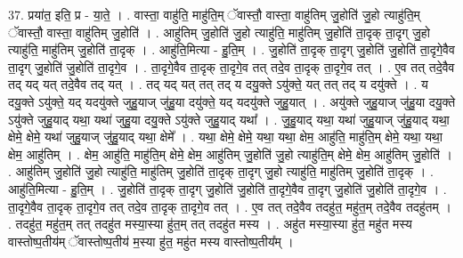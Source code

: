 \documentclass[17pt]{extarticle}
\begin{document}
37. प्रया॑त॒ इति॒ प्र - या॒ते॒ । . वास्ता॒ वाहु॑ति॒ माहु॑ति॒म् ॅवास्तौ॒ वास्ता॒ वाहु॑तिम् जु॒होति॑ जु॒हो त्याहु॑ति॒म् ॅवास्तौ॒ वास्ता॒ वाहु॑तिम् जु॒होति॑ । . आहु॑तिम् जु॒होति॑ जु॒हो त्याहु॑ति॒ माहु॑तिम् जु॒होति॑ ता॒दृक् ता॒दृग् जु॒हो त्याहु॑ति॒ माहु॑तिम् जु॒होति॑ ता॒दृक् । . आहु॑ति॒मित्या - हु॒ति॒म् । . जु॒होति॑ ता॒दृक् ता॒दृग् जु॒होति॑ जु॒होति॑ ता॒दृगे॒वैव ता॒दृग् जु॒होति॑ जु॒होति॑ ता॒दृगे॒व । . ता॒दृगे॒वैव ता॒दृक् ता॒दृगे॒व तत् तदे॒व ता॒दृक् ता॒दृगे॒व तत् । . ए॒व तत् तदे॒वैव तद् यद् यत् तदे॒वैव तद् यत् । . तद् यद् यत् तत् तद् य दयु॒क्ते ऽयु॑क्ते॒ यत् तत् तद् य दयु॑क्ते । . य दयु॒क्ते ऽयु॑क्ते॒ यद् यदयु॑क्ते जुहु॒याज् जु॑हु॒या दयु॑क्ते॒ यद् यदयु॑क्ते जुहु॒यात् । . अयु॑क्ते जुहु॒याज् जु॑हु॒या दयु॒क्ते ऽयु॑क्ते जुहु॒याद् यथा॒ यथा॑ जुहु॒या दयु॒क्ते ऽयु॑क्ते जुहु॒याद् यथा᳚ । . जु॒हु॒याद् यथा॒ यथा॑ जुहु॒याज् जु॑हु॒याद् यथा॒ क्षेमे॒ क्षेमे॒ यथा॑ जुहु॒याज् जु॑हु॒याद् यथा॒ क्षेमे᳚ । . यथा॒ क्षेमे॒ क्षेमे॒ यथा॒ यथा॒ क्षेम॒ आहु॑ति॒ माहु॑ति॒म् क्षेमे॒ यथा॒ यथा॒ क्षेम॒ आहु॑तिम् । . क्षेम॒ आहु॑ति॒ माहु॑ति॒म् क्षेमे॒ क्षेम॒ आहु॑तिम् जु॒होति॑ जु॒हो त्याहु॑ति॒म् क्षेमे॒ क्षेम॒ आहु॑तिम् जु॒होति॑ । . आहु॑तिम् जु॒होति॑ जु॒हो त्याहु॑ति॒ माहु॑तिम् जु॒होति॑ ता॒दृक् ता॒दृग् जु॒हो त्याहु॑ति॒ माहु॑तिम् जु॒होति॑ ता॒दृक् । . आहु॑ति॒मित्या - हु॒ति॒म् । . जु॒होति॑ ता॒दृक् ता॒दृग् जु॒होति॑ जु॒होति॑ ता॒दृगे॒वैव ता॒दृग् जु॒होति॑ जु॒होति॑ ता॒दृगे॒व । . ता॒दृगे॒वैव ता॒दृक् ता॒दृगे॒व तत् तदे॒व ता॒दृक् ता॒दृगे॒व तत् । . ए॒व तत् तदे॒वैव तदहु॑त॒ महु॑त॒म् तदे॒वैव तदहु॑तम् । . तदहु॑त॒ महु॑त॒म् तत् तदहु॑त मस्या॒स्या हु॑त॒म् तत् तदहु॑त मस्य । . अहु॑त मस्या॒स्या हु॑त॒ महु॑त मस्य वास्तोष्प॒तीय॑म् ॅवास्तोष्प॒तीय॑ म॒स्या हु॑त॒ महु॑त मस्य वास्तोष्प॒तीय᳚म् । \newline
\end{document}
